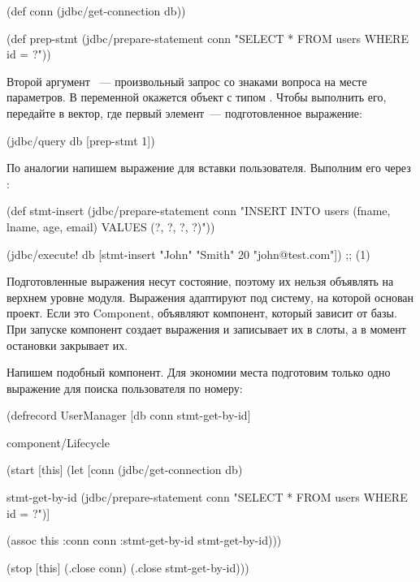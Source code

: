 \begin{english}
  \begin{clojure/lines}
(def conn
  (jdbc/get-connection db))

(def prep-stmt
  (jdbc/prepare-statement conn
    "SELECT * FROM users WHERE id = ?"))
  \end{clojure/lines}
\end{english}

Второй аргумент ~--- произвольный запрос со знаками вопроса на месте параметров. В переменной  окажется объект с типом  . Чтобы выполнить его, передайте в  вектор, где первый элемент~--- подготовленное выражение:

\begin{english}
  \begin{clojure}
(jdbc/query db [prep-stmt 1])
  \end{clojure}
\end{english}

По аналогии напишем выражение для вставки пользователя. Выполним его через :

\begin{english}
  \begin{clojure}
(def stmt-insert
  (jdbc/prepare-statement conn
    "INSERT INTO users (fname, lname, age, email)
     VALUES (?, ?, ?, ?)"))

(jdbc/execute! db
  [stmt-insert "John" "Smith" 20 "john@test.com"])
;; (1)
  \end{clojure}
\end{english}

Подготовленные выражения несут состояние, поэтому их нельзя объявлять на верхнем уровне модуля. Выражения адаптируют под систему, на которой основан проект. Если это Component, объявляют компонент, который зависит от базы. При запуске компонент создает выражения и записывает их в слоты, а в момент остановки закрывает их.

Напишем подобный компонент. Для экономии места подготовим только одно выражение для поиска пользователя по номеру:

\begin{english}
  \begin{clojure}
(defrecord UserManager
    [db
     conn
     stmt-get-by-id]

  component/Lifecycle

  (start [this]
    (let [conn
          (jdbc/get-connection db)

          stmt-get-by-id
          (jdbc/prepare-statement conn
            "SELECT * FROM users WHERE id = ?")]

      (assoc this
             :conn conn
             :stmt-get-by-id stmt-get-by-id)))

  (stop [this]
    (.close conn)
    (.close stmt-get-by-id)))
  \end{clojure}
\end{english}

